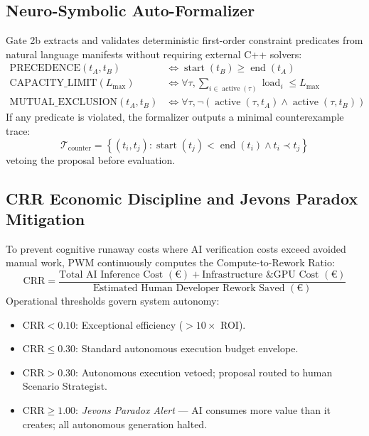 \documentclass[11pt,a4paper]{article}
\begin{document}
\subsection{Neuro-Symbolic Auto-Formalizer}
Gate 2b extracts and validates deterministic first-order constraint predicates from natural language manifests without requiring external C++ solvers:
\begin{align}
    \text{PRECEDENCE}(t_A, t_B) &\iff \operatorname{start}(t_B) \ge \operatorname{end}(t_A) \\
    \text{CAPACITY\_LIMIT}(L_{\max}) &\iff \forall \tau, \sum_{i \in \operatorname{active}(\tau)} \operatorname{load}_i \le L_{\max} \\
    \text{MUTUAL\_EXCLUSION}(t_A, t_B) &\iff \forall \tau, \neg\left(\operatorname{active}(\tau, t_A) \land \operatorname{active}(\tau, t_B)\right)
\end{align}
If any predicate is violated, the formalizer outputs a minimal counterexample trace:
\begin{equation}
    \mathcal{T}_{\text{counter}} = \left\{ (t_i, t_j) : \operatorname{start}(t_j) < \operatorname{end}(t_i) \land t_i \prec t_j \right\}
\end{equation}
vetoing the proposal before evaluation.

\subsection{CRR Economic Discipline and Jevons Paradox Mitigation}
To prevent cognitive runaway costs where AI verification costs exceed avoided manual work, PWM continuously computes the Compute-to-Rework Ratio:
\begin{equation}
    \text{CRR} = \frac{\text{Total AI Inference Cost } (€) + \text{Infrastructure \& GPU Cost } (€)}{\text{Estimated Human Developer Rework Saved } (€)}
\end{equation}
Operational thresholds govern system autonomy:
\begin{itemize}
    \item $\text{CRR} < 0.10$: Exceptional efficiency ($>10\times$ ROI).
    \item $\text{CRR} \le 0.30$: Standard autonomous execution budget envelope.
    \item $\text{CRR} > 0.30$: Autonomous execution vetoed; proposal routed to human Scenario Strategist.
    \item $\text{CRR} \ge 1.00$: \emph{Jevons Paradox Alert} --- AI consumes more value than it creates; all autonomous generation halted.
\end{itemize}
\end{document}
